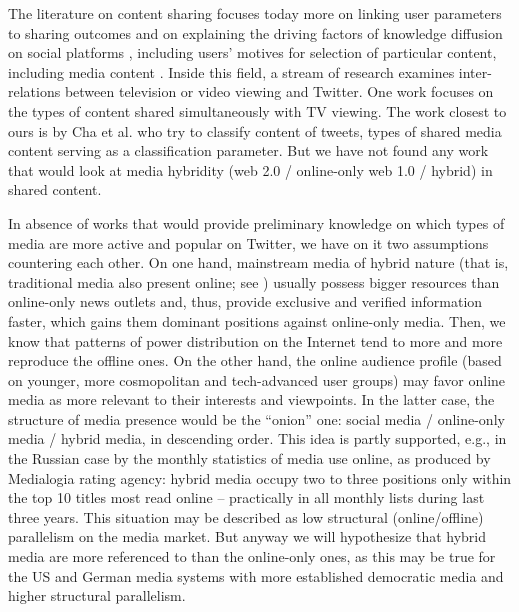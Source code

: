 The literature on content sharing focuses today more on linking user parameters to sharing outcomes and on explaining the driving factors of knowledge diffusion on social platforms \cite{Osatuyi}, including users’ motives for selection of particular content, including media content \cite{LeeMa}. Inside this field, a stream of research examines inter-relations between television or video viewing and Twitter. One work \cite{WohnNa} focuses on the types of content shared simultaneously with TV viewing. The work closest to ours is by Cha et al. \cite{ChaBenevenutoHaddadi} who try to classify content of tweets, types of shared media content serving as a classification parameter. But we have not found any work that would look at media hybridity (web 2.0 / online-only web 1.0 / hybrid) in shared content.

In absence of works that would provide preliminary knowledge on which types of media are more active and popular on Twitter, we have on it two assumptions countering each other. On one hand, mainstream media of hybrid nature (that is, traditional media also present online; see \cite{Chadwick}) usually possess bigger resources than online-only news outlets and, thus, provide exclusive and verified information faster, which gains them dominant positions against online-only media. Then, we know that patterns of power distribution on the Internet tend to more and more reproduce the offline ones. On the other hand, the online audience profile (based on younger, more cosmopolitan and tech-advanced user groups) may favor online media as more relevant to their interests and viewpoints. In the latter case, the structure of media presence would be the “onion” one: social media / online-only media / hybrid media, in descending order. This idea is partly supported, e.g., in the Russian case by the monthly statistics of media use online, as produced by Medialogia rating agency: hybrid media occupy two to three positions only within the top 10 titles most read online -- practically in all monthly lists during last three years. This situation may be described as low structural (online/offline) parallelism on the media market. But anyway we will hypothesize that hybrid media are more referenced to than the online-only ones, as this may be true for the US and German media systems with more established democratic media and higher structural parallelism.

